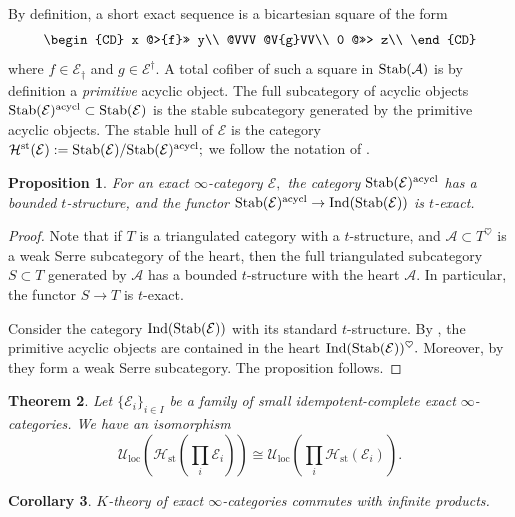 \documentclass[11pt,leqno]{amsart}
\newtheorem{theo}{Theorem}[section]
\newtheorem{prop}[theo]{Proposition}
\newtheorem{cor}[theo]{Corollary}
\numberwithin{equation}{section}
\newcommand{\prodd}[1][]{\mathop{\prod}\limits_{#1}}
\newcommand{\loc}{\operatorname{loc}}
\newcommand{\st}{\operatorname{st}}
\newcommand{\cA}{{\mathcal A}}
\newcommand{\cE}{{\mathcal E}}
\newcommand{\cU}{{\mathcal U}}
\newcommand{\cH}{{\mathcal H}}
\newcommand{\Ind}{\operatorname{Ind}}
\newcommand{\Stab}{\rm Stab}
\newcommand{\acycl}{\operatorname{acycl}}
\begin{document}
By definition, a short exact sequence is a bicartesian square of the form
$$
\begin{CD}
x @>{f}>> y\\
@VVV @V{g}VV\\
0 @>>> z\\
\end{CD}
$$
where $f\in\cE_\dagger$ and  $g\in\cE^\dagger.$ A total cofiber of such a square in $\Stab(\cA)$ is by definition a {\it primitive} acyclic object. The full subcategory of acyclic objects $\Stab(\cE)^{\acycl}\subset \Stab(\cE)$ is the stable subcategory generated by the primitive acyclic objects. The stable hull of $\cE$ is the category $\cH^{\st}(\cE):=\Stab(\cE)/\Stab(\cE)^{\acycl};$ we follow the notation of \cite{Kle}.

\begin{prop}\label{prop:t-structure_on_acyclic} For an exact $\infty$-category $\cE,$ the category $\Stab(\cE)^{\acycl}$ has a bounded $t$-structure, and the functor $\Stab(\cE)^{\acycl}\to\Ind(\Stab(\cE))$ is $t$-exact.\end{prop}

\begin{proof}Note that if $T$ is a triangulated category with a $t$-structure, and $\cA\subset T^{\heartsuit}$ is a weak Serre subcategory of the heart, then the full triangulated subcategory $S\subset T$ generated by $\cA$ has a bounded $t$-structure with the heart $\cA.$ In particular, the functor $S\to T$ is $t$-exact.

Consider the category $\Ind(\Stab(\cE))$ with its standard $t$-structure. By \cite[Proposition 3.10]{Kle}, the primitive acyclic objects are contained in the heart $\Ind(\Stab(\cE))^{\heartsuit}.$ Moreover, by \cite[Lemma 3.11 and Lemma 3.12]{Kle} they form a weak Serre subcategory.  The proposition follows.\end{proof}

\begin{theo}\label{th:U_loc_products_exact_cats} Let $\{\cE_i\}_{i\in I}$ be a family of small idempotent-complete exact $\infty$-categories. We have an isomorphism
$$\cU_{\loc}(\cH_{\st}(\prodd[i]\cE_i))\cong \cU_{\loc}(\prod\limits_{i}\cH_{\st}(\cE_i)).$$\end{theo} 

\begin{cor}\label{cor:K_theory_of_exact_cats_comm_with_products} $K$-theory of exact $\infty$-categories commutes with infinite products.\end{cor}
\end{document}
